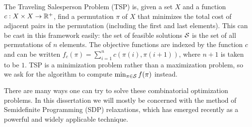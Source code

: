 \begin{example}
The Traveling Salesperson Problem (TSP) is, given a set $X$ and a function $c: X\times X \rightarrow \mathbb R^+$, find a permutation $\pi$ of $X$ that minimizes the total cost of adjacent pairs in the permutation (including the first and last elements). This can be cast in this framework easily: the set of feasible solutions $\mathcal S$ is the set of all permutations of $n$ elements. The objective functions are indexed by the function $c$ and can be written $f_c(\pi) = \sum_{i=1}^n c(\pi(i),\pi(i+1))$, where $n+1$ is taken to be $1$. TSP is a minimization problem rather than a maximization problem, so we ask for the algorithm to compute $\min_{\pi \in \mathcal S} f(\pi)$ instead. 
\end{example}
There are many ways one can try to solve these combinatorial optimization problems. In this dissertation we will mostly be concerned with the method of Semidefinite Programming (SDP) relaxations, which has emerged recently as a powerful and widely applicable technique. 

